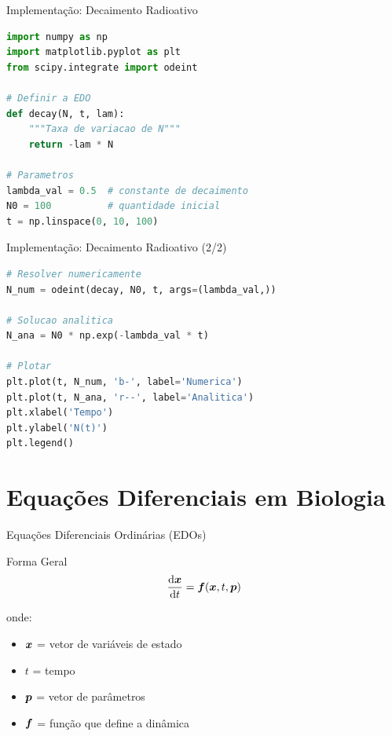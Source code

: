 \begin{frame}{Implementação: Decaimento Radioativo}
\begin{lstlisting}[language=Python, caption=Solução numérica do decaimento, basicstyle=\ttfamily\footnotesize]
import numpy as np
import matplotlib.pyplot as plt
from scipy.integrate import odeint

# Definir a EDO
def decay(N, t, lam):
    """Taxa de variacao de N"""
    return -lam * N

# Parametros
lambda_val = 0.5  # constante de decaimento
N0 = 100          # quantidade inicial
t = np.linspace(0, 10, 100)
\end{lstlisting}
\end{frame}

\begin{frame}[fragile, shrink=5]{Implementação: Decaimento Radioativo (2/2)}
\begin{lstlisting}[language=Python, caption=Solução e Visualização]
# Resolver numericamente
N_num = odeint(decay, N0, t, args=(lambda_val,))

# Solucao analitica
N_ana = N0 * np.exp(-lambda_val * t)

# Plotar
plt.plot(t, N_num, 'b-', label='Numerica')
plt.plot(t, N_ana, 'r--', label='Analitica')
plt.xlabel('Tempo')
plt.ylabel('N(t)')
plt.legend()
\end{lstlisting}
\end{frame}

\section{Equações Diferenciais em Biologia}

\begin{frame}[shrink=5]{Equações Diferenciais Ordinárias (EDOs)}

\vspace{0.3cm}

\begin{block}{Forma Geral}
\begin{equation*}
\frac{\mathrm{d} \boldsymbol{x}}{\mathrm{d} t} = \boldsymbol{f}(\boldsymbol{x}, t, \boldsymbol{p})
\end{equation*}

onde:
\begin{itemize}
    \item $\boldsymbol{x}$ = vetor de variáveis de estado
    \item $t$ = tempo
    \item $\boldsymbol{p}$ = vetor de parâmetros
    \item $\boldsymbol{f}$ = função que define a dinâmica
\end{itemize}
\end{block}
\end{frame}

